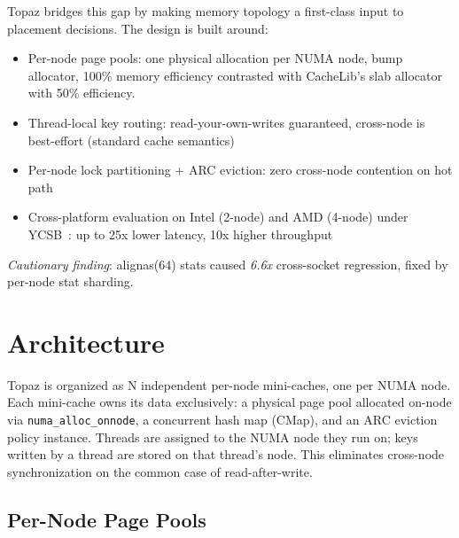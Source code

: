 \documentclass[sigplan,10pt]{acmart}
\begin{document}
Topaz bridges this gap by making memory topology a first-class input to placement decisions.
The design is built around:
\begin{itemize}
  \item Per-node page pools: one physical allocation per NUMA node, bump allocator, 100\% memory efficiency contrasted with CacheLib's slab allocator~\cite{slab} with 50\% efficiency.
  \item Thread-local key routing: read-your-own-writes guaranteed, cross-node is best-effort (standard cache semantics)
  \item Per-node lock partitioning + ARC eviction: zero cross-node contention on hot path
  \item Cross-platform evaluation on Intel (2-node) and AMD (4-node) under YCSB~\cite{ycsb}: up to 25x lower latency, 10x higher throughput
\end{itemize}

\emph{Cautionary finding}: alignas(64) stats caused \emph{6.6x} cross-socket regression, fixed by per-node stat sharding.

\section{Architecture}
\label{sec:arch}

Topaz is organized as N independent per-node mini-caches, one per NUMA node.
Each mini-cache owns its data exclusively: a physical page pool allocated on-node via \texttt{numa\_alloc\_onnode}, a concurrent hash map (CMap), and an ARC eviction policy instance.
Threads are assigned to the NUMA node they run on; keys written by a thread are stored on that thread's node.
This eliminates cross-node synchronization on the common case of read-after-write.



\subsection{Per-Node Page Pools}
\end{document}
